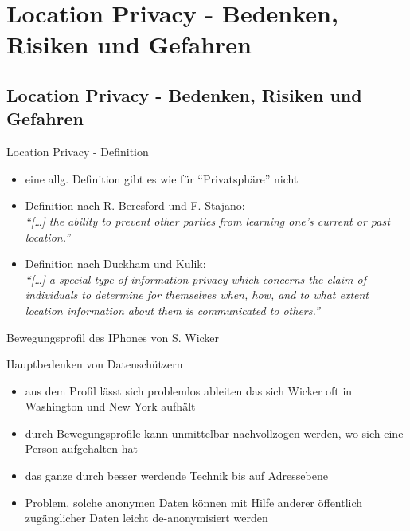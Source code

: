 \section[Location Privacy]{Location Privacy - Bedenken, Risiken und Gefahren}
\subsection{Location Privacy - Bedenken, Risiken und Gefahren}
\begin{frame}{Location Privacy - Definition}
\begin{itemize}
  \item eine allg. Definition gibt es wie für "`Privatsphäre"' nicht
  \item Definition nach R. Beresford und F. Stajano:\\ \vspace{.5cm}
  \textit{"`[\dots] the ability to prevent other parties from learning one’s current or past location."'}
  \vspace{.5cm}
  \item Definition nach Duckham und Kulik:\\ \vspace{.5cm}
  \textit{"`[\dots] a special type of information privacy which concerns the claim of individuals to determine for themselves when, how, and to what extent location information about them is communicated to others."'}
\end{itemize}
\end{frame}

\begin{frame}{Bewegungsprofil des IPhones von S. Wicker}
  \begin{center}
  \end{center}
\end{frame}

\begin{frame}{Hauptbedenken von Datenschützern}
  \begin{itemize}
  \item aus dem Profil lässt sich problemlos ableiten das sich Wicker oft in Washington und New York aufhält
  \item durch Bewegungsprofile kann unmittelbar nachvollzogen werden, wo sich eine Person aufgehalten hat
  \item das ganze durch besser werdende Technik bis auf Adressebene
  \item Problem, solche anonymen Daten können mit Hilfe anderer öffentlich zugänglicher Daten leicht de-anonymisiert werden
  \end{itemize}
\end{frame}

